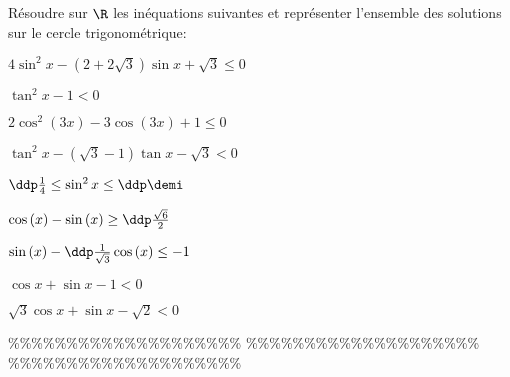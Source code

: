 



\begin{exercice}  \;
R\'esoudre sur $\R$ les in\'equations suivantes et repr\'esenter l'ensemble des solutions sur le cercle trigonom\'etrique:\\
\begin{enumerate}
\begin{minipage}[t]{0.45\textwidth}
\item $4\sin^2{x}-(2+2\sqrt{3})\sin{x}+\sqrt{3}\leq 0$
\item $\tan^2{x}-1<0$
\item $2\cos^2{(3x)}-3\cos{(3x)}+1\leq 0$   
\item $\tan^2{x}-(\sqrt{3}-1)\tan{x}-\sqrt{3}<0$
\item $\ddp\frac{1}{4}\leq \sin^2{x}\leq \ddp\demi$
\end{minipage}
\begin{minipage}[t]{0.45\textwidth}
\item $\cos{(x)}-\sin{(x)}\geq \ddp\frac{\sqrt{6}}{2}$  
\item $\sin{(x)}-\ddp\frac{1}{\sqrt{3}}\cos{(x)}\leq -1$
\item $\cos{x}+\sin{x}-1<0$
\item $\sqrt{3}\cos{x}+\sin{x}-\sqrt{2}<0$
\end{minipage}
\end{enumerate}
\end{exercice}


\%\%\%\%\%\%\%\%\%\%\%\%\%\%\%\%\%\%\%\%
\%\%\%\%\%\%\%\%\%\%\%\%\%\%\%\%\%\%\%\%
\%\%\%\%\%\%\%\%\%\%\%\%\%\%\%\%\%\%\%\%




